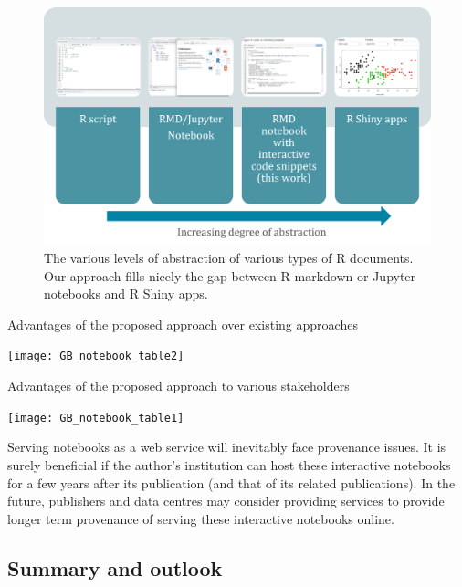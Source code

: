 \begin{Schunk}
\begin{figure}
\includegraphics[width=\textwidth]{learnr_abstraction} \caption[The various levels of abstraction of various types of R documents]{The various levels of abstraction of various types of R documents. Our approach fills nicely the gap between R markdown or Jupyter notebooks and R Shiny apps.}\label{fig:fig1}
\end{figure}
\end{Schunk}

\begin{table}
  \caption{Advantages of the proposed approach over existing approaches}
  \label{tbl:table1}
  \texttt{[image: GB\_notebook\_table2]}
\end{table}

\begin{table}
  \caption{Advantages of the proposed approach to various stakeholders}
  \label{tbl:table2}
  \texttt{[image: GB\_notebook\_table1]}
\end{table}

Serving notebooks as a web service will inevitably face provenance
issues. It is surely beneficial if the author's institution can host
these interactive notebooks for a few years after its publication (and
that of its related publications). In the future, publishers and data
centres may consider providing services to provide longer term
provenance of serving these interactive notebooks online.

\hypertarget{summary-and-outlook}{%
\subsection{Summary and outlook}\label{summary-and-outlook}}

